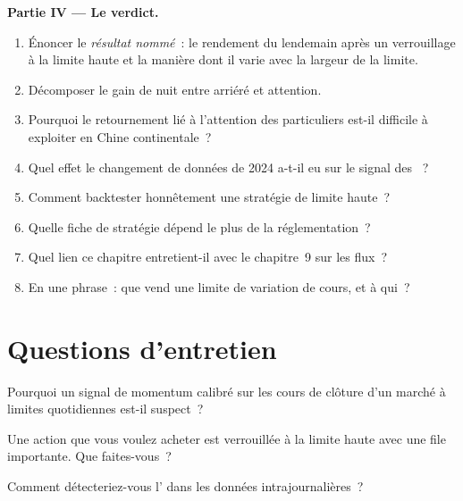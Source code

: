 \begin{problem}
\medskip\noindent\textbf{Partie IV --- Le verdict.}
\begin{enumerate}[resume]
\item Énoncer le \emph{résultat nommé}~: le rendement du lendemain après un verrouillage à la limite haute et la manière dont il varie avec la largeur de la limite.
\item Décomposer le gain de nuit entre arriéré et attention.
\item Pourquoi le retournement lié à l'attention des particuliers est-il difficile à exploiter en Chine continentale~?
\item Quel effet le changement de données de 2024 a-t-il eu sur le signal des ~?
\item Comment backtester honnêtement une stratégie de limite haute~?
\item Quelle fiche de stratégie dépend le plus de la réglementation~?
\item Quel lien ce chapitre entretient-il avec le chapitre~9 sur les flux~?
\item En une phrase~: que vend une limite de variation de cours, et à qui~?
\end{enumerate}
\end{problem}

\section{Questions d'entretien}

\begin{interviewq}\label{iq:s1:asia-specific-equity-strategies:1}
Pourquoi un signal de momentum calibré sur les cours de clôture d'un marché à limites quotidiennes est-il suspect~?
\end{interviewq}

\begin{interviewq}\label{iq:s1:asia-specific-equity-strategies:2}
Une action que vous voulez acheter est verrouillée à la limite haute avec une file importante. Que faites-vous~?
\end{interviewq}

\begin{interviewq}\label{iq:s1:asia-specific-equity-strategies:3}
Comment détecteriez-vous l' dans les données intrajournalières~?
\end{interviewq}

